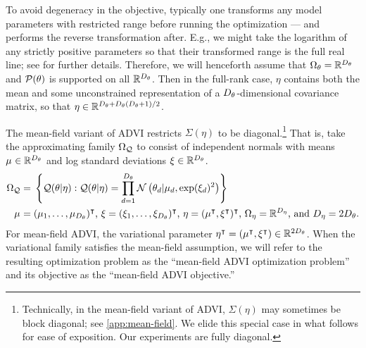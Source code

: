 To avoid degeneracy in the objective, typically one transforms any model
parameters with restricted range before running the optimization --- and
performs the reverse transformation after. E.g., we might take the logarithm of
any strictly positive parameters so that their transformed range is the full
real line; see \citet{kucukelbir:2017:advi} for further details. Therefore, we
will henceforth assume that $\Omega_{\theta} = \mathbb{R}^{D_{\theta}}$ and $\mathcal{P}(\theta)$ is
supported on all $\mathbb{R}^{D_{\theta}}$. Then in the full-rank case, $\eta$ contains
both the mean and some unconstrained representation of a $D_{\theta}$-dimensional
covariance matrix, so that $\eta \in \mathbb{R}^{D_{\theta} + D_{\theta} (D_{\theta} + 1)
/ 2}$.

The mean-field variant of ADVI restricts $\Sigma(\eta)$ to be
diagonal.\footnote{Technically, in the mean-field variant of ADVI,
$\Sigma(\eta)$ may sometimes be block diagonal; see \cref{app:mean-field}.
We elide this special case in what
follows for ease of exposition. Our experiments are fully diagonal.} That is,
take the approximating family $\Omega_{\mathcal{Q}}$ to consist of independent normals with
means $\mu_{} \in \mathbb{R}^{D_{\theta}}$ and log standard deviations $\xi_{} \in
\mathbb{R}^{D_{\theta}}$.
\begin{align}\label{eq:advi_qdom_mf}
%
\qdom ={}& \left\{
    \q(\theta \vert \eta):
    \q(\theta \vert \eta) =
        \prod_{d=1}^{\thetadim}
            \normal{\theta_d}{\etamu[d], \exp(\etaxi[d])^2}
\right\} \\
\etamu ={}& (\etamu[1], \ldots, \etamu[\thetadim])^\trans
\textrm{, }
\etaxi = (\etaxi[1], \ldots, \etaxi[\thetadim])^\trans
\textrm{, }
\eta = (\etamu^\trans, \etaxi^\trans)^\trans
\textrm{, }
\etadom = \mathbb{R}^{\etadim}
\textrm{, and }
\etadim = 2\thetadim.
\nonumber
%
\end{align}
For mean-field ADVI, the variational parameter $\eta^\intercal = (\mu_{}^\intercal,
\xi_{}^\intercal) \in \mathbb{R}^{2D_{\theta}}$. When the variational family satisfies the
mean-field assumption, we will refer to the resulting optimization problem as
the ``mean-field ADVI optimization problem'' and its objective as the
``mean-field ADVI objective.''

